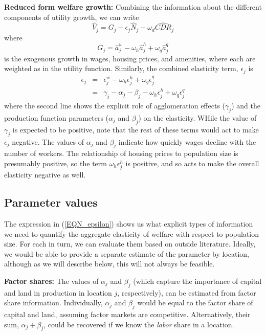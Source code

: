 \documentclass[10pt]{article}
\begin{document}
\textbf{Reduced form welfare growth:} Combining the information about the different components of utility growth, we can write
\begin{equation}
    \hat{V}_j = G_j - \epsilon_j \hat{N}_j - \omega_d \hat{CDR}_j
\end{equation}
where 
\begin{equation}
    G_j = \hat{a}^w_j - \omega_h \hat{a}^h_j + \omega_q \hat{a}^q_j
\end{equation}
is the exogenous growth in wages, housing prices, and amenities, where each are weighted as in the utility function. Similarly, the combined elasticity term, $\epsilon_j$ is
\begin{eqnarray}
    \epsilon_j &=& \epsilon^w_j - \omega_h \epsilon^h_j + \omega_q \epsilon^q_j \\
               &=& \gamma_j - \alpha_j - \beta_j - \omega_h \epsilon^h_j + \omega_q \epsilon^q_j \label{EQN_epsilon}
\end{eqnarray}
where the second line shows the explicit role of agglomeration effects ($\gamma_j$) and the production function parameters ($\alpha_j$ and $\beta_j$) on the elasticity. WHile the value of $\gamma_j$ is expected to be positive, note that the rest of these terms would act to make $\epsilon_j$ negative. The values of $\alpha_j$ and $\beta_j$ indicate how quickly wages decline with the number of workers. The relationship of housing prices to population size is presumably positive, so the term $\omega_h \epsilon^h_j$ is positive, and so acts to make the overall elasticity negative as well.

\subsection{Parameter values}
The expression in (\ref{EQN_epsilon}) shows us what explicit types of information we need to quantify the aggregate elasticity of welfare with respect to population size. For each in turn, we can evaluate them based on outside literature. Ideally, we would be able to provide a separate estimate of the parameter by location, although as we will describe below, this will not always be feasible.

\textbf{Factor shares:} The values of $\alpha_j$ and $\beta_j$ (which capture the importance of capital and land in production in location $j$, respectively), can be estimated from factor share information. Individually, $\alpha_j$ and $\beta_j$ would be equal to the factor share of capital and land, assuming factor markets are competitive. Alternatively, their sum, $\alpha_j + \beta_j$, could be recovered if we know the \textit{labor} share in a location. 
\end{document}
